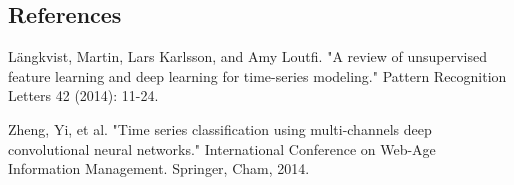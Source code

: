 \documentclass[12pt]{article}
\begin{document}
%        
%
%        

\subsection*{References}

\begin{description}

\item
Längkvist, Martin, Lars Karlsson, and Amy Loutfi. "A review of unsupervised feature learning and deep learning for time-series modeling." Pattern Recognition Letters 42 (2014): 11-24.

\item
Zheng, Yi, et al. "Time series classification using multi-channels deep convolutional neural networks." International Conference on Web-Age Information Management. Springer, Cham, 2014.

\end{description}
\end{document}
